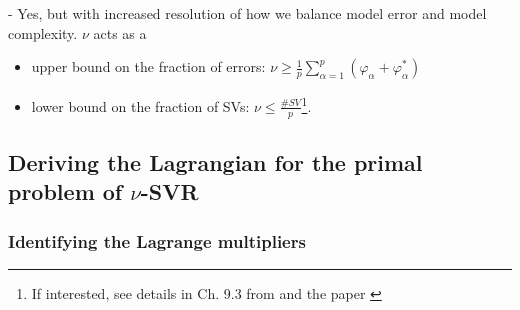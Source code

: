 \begin{frame}
     - Yes, but with increased resolution of how we balance model error and model complexity. %
     $\nu$ acts as a
     \begin{itemize}
     \item upper bound on the fraction of errors: $\nu \ge \frac{1}{p} \sum_{\alpha=1}^p (\varphi_\alpha + \varphi_\alpha^*)$
     \item lower bound on the fraction of SVs: $\nu \le \frac{\# SV}{p}${\footnote{\slidesonly{\tiny} If interested, see details in Ch. 9.3 from \citep{scholkopf2001learning} and the paper \citep{scholkopf2000new}}}.
     \end{itemize}
\end{frame}

\newpage

\subsection{Deriving the Lagrangian for the primal problem of $\nu$-SVR}

\subsubsection{Identifying the Lagrange multipliers}

